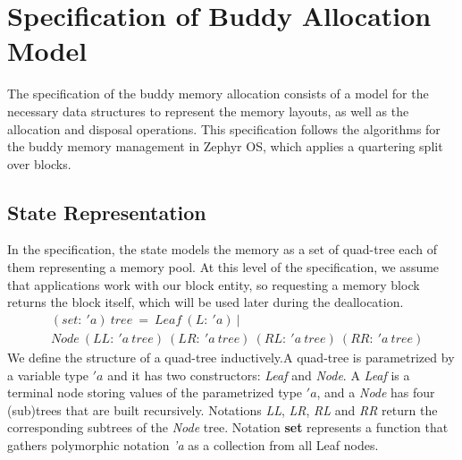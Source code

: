 \section{Specification of Buddy Allocation Model}\label{sec:spec}
The specification of the buddy memory allocation consists of a model for the necessary data structures to represent the memory layouts, as well as the allocation and disposal operations. This specification follows the algorithms for the buddy memory management in Zephyr OS, which applies a quartering split over blocks.

\subsection{State Representation}
\label{statedes}
{In the specification, the state models the memory as a set of  quad-tree each of them representing a memory pool. At this level of the specification, we assume that applications work with our block entity, so requesting a memory block returns the block itself, which will be used later during the deallocation.}
{\footnotesize
\begin{align*}
&(set:\ 'a)\ tree\ =\ Leaf\ (L:\ 'a)\ | \\
&Node\ (LL:\ 'a\ tree)\ (LR:\ 'a\ tree)\ (RL:\ 'a\ tree)\ (RR:\ 'a\ tree)
\end{align*}
}
{We define the structure of a quad-tree inductively}.{A quad-tree is parametrized by a variable type $'a$ and it has two constructors}: \emph{Leaf} and \emph{Node}. {A \emph{Leaf} is a terminal node storing values of the parametrized type $'a$, and a \emph{Node} has four (sub)trees that are built recursively.} Notations \emph{LL}, \emph{LR}, \emph{RL} and \emph{RR} return the corresponding subtrees of the \emph{Node} tree. Notation \textbf{set} {represents} a function that gathers polymorphic notation \emph{'a} as a collection from all Leaf nodes.

